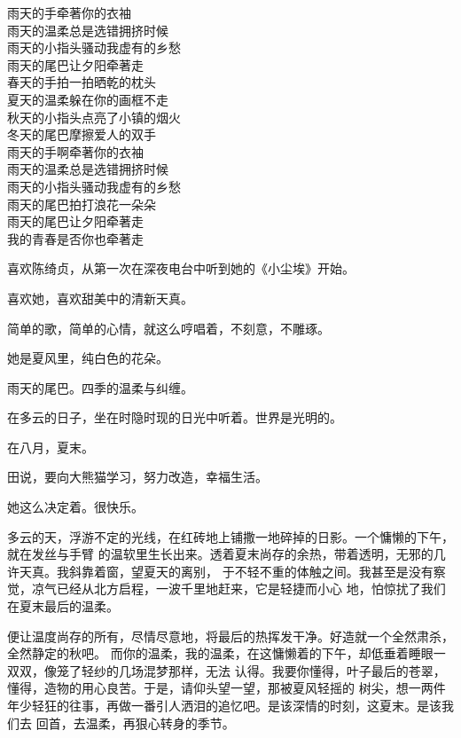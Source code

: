 		\longpoem{}{}{}
			雨天的手牵著你的衣袖 \\
			雨天的温柔总是选错拥挤时候 \\
			雨天的小指头骚动我虚有的乡愁 \\
			雨天的尾巴让夕阳牵著走 \\
			春天的手拍一拍晒乾的枕头 \\
			夏天的温柔躲在你的画框不走 \\
			秋天的小指头点亮了小镇的烟火 \\
			冬天的尾巴摩擦爱人的双手 \\
			雨天的手啊牵著你的衣袖 \\
			雨天的温柔总是选错拥挤时候 \\
			雨天的小指头骚动我虚有的乡愁 \\
			雨天的尾巴拍打浪花一朵朵 \\
			雨天的尾巴让夕阳牵著走 \\
			我的青春是否你也牵著走
		\endlongpoem

		喜欢陈绮贞，从第一次在深夜电台中听到她的《小尘埃》开始。\par
		喜欢她，喜欢甜美中的清新天真。\par
		简单的歌，简单的心情，就这么哼唱着，不刻意，不雕琢。\par
		她是夏风里，纯白色的花朵。

		雨天的尾巴。四季的温柔与纠缠。\par
		在多云的日子，坐在时隐时现的日光中听着。世界是光明的。\par
		在八月，夏末。

		田说，要向大熊猫学习，努力改造，幸福生活。\par
		她这么决定着。很快乐。

	\endwriting



		多云的天，浮游不定的光线，在红砖地上铺撒一地碎掉的日影。一个慵懒的下午，就在发丝与手臂
	的温软里生长出来。透着夏末尚存的余热，带着透明，无邪的几许天真。我斜靠着窗，望夏天的离别，
	于不轻不重的体触之间。我甚至是没有察觉，凉气已经从北方启程，一波千里地赶来，它是轻捷而小心
	地，怕惊扰了我们在夏末最后的温柔。

		便让温度尚存的所有，尽情尽意地，将最后的热挥发干净。好造就一个全然肃杀，全然静定的秋吧。
	而你的温柔，我的温柔，在这慵懒着的下午，却低垂着睡眼一双双，像笼了轻纱的几场混梦那样，无法
	认得。我要你懂得，叶子最后的苍翠，懂得，造物的用心良苦。于是，请仰头望一望，那被夏风轻摇的
	树尖，想一两件年少轻狂的往事，再做一番引人洒泪的追忆吧。是该深情的时刻，这夏末。是该我们去
	回首，去温柔，再狠心转身的季节。

